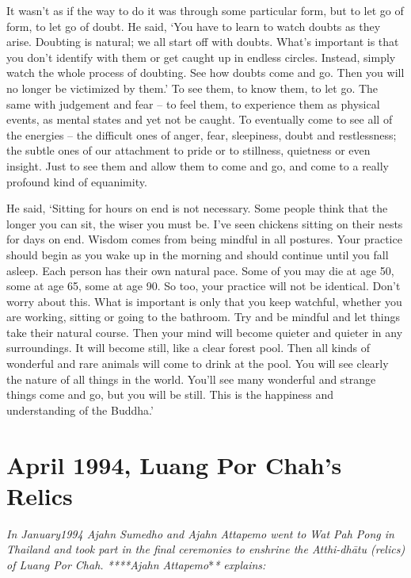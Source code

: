 It wasn't as if the way to do it was through some particular form, but
to let go of form, to let go of doubt. He said, `You have to learn to
watch doubts as they arise. Doubting is natural; we all start off with
doubts. What's important is that you don't identify with them or get
caught up in endless circles. Instead, simply watch the whole process of
doubting. See how doubts come and go. Then you will no longer be
victimized by them.' To see them, to know them, to let go. The same with
judgement and fear -- to feel them, to experience them as physical
events, as mental states and yet not be caught. To eventually come to
see all of the energies -- the difficult ones of anger, fear, 
sleepiness, doubt and restlessness; the subtle ones of our attachment to
pride or to stillness, quietness or even insight. Just to see them and
allow them to come and go, and come to a really profound kind of
equanimity. 

He said, `Sitting for hours on end is not necessary. Some people think
that the longer you can sit, the wiser you must be. I've seen chickens
sitting on their nests for days on end. Wisdom comes from being mindful
in all postures. Your practice should begin as you wake up in the
morning and should continue until you fall asleep. Each person has their
own natural pace. Some of you may die at age 50, some at age 65, some at
age 90. So too, your practice will not be identical. Don't worry about
this. What is important is only that you keep watchful, whether you are
working, sitting or going to the bathroom. Try and be mindful and let
things take their natural course. Then your mind will become quieter and
quieter in any surroundings. It will become still, like a clear forest
pool. Then all kinds of wonderful and rare animals will come to drink at
the pool. You will see clearly the nature of all things in the world. 
You'll see many wonderful and strange things come and go, but you will
be still. This is the happiness and understanding of the Buddha.'

\chapter{April 1994, Luang Por Chah's Relics}

\emph{In January1994 Ajahn Sumedho and Ajahn Attapemo went to Wat Pah
Pong in Thailand and took part in the final ceremonies to enshrine the
Atthi-dhātu (relics) of Luang Por Chah. ****Ajahn Attapemo}*\emph{*
explains:}

